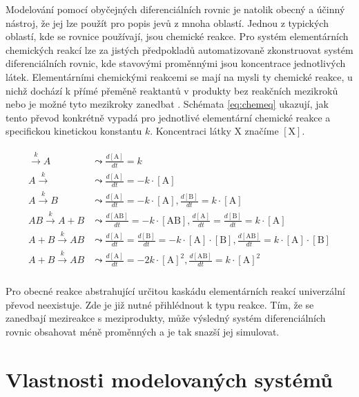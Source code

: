 Modelování pomocí obyčejných diferenciálních rovnic je natolik obecný a účinný nástroj,
že jej lze použít pro popis jevů z mnoha oblastí. Jednou z typických oblastí, kde
se rovnice používají, jsou chemické reakce. Pro systém elementárních chemických reakcí
lze za jistých předpokladů \cite{TODO} automatizovaně zkonstruovat systém diferenciálních rovnic,
kde stavovými proměnnými jsou koncentrace jednotlivých látek. Elementárními che\-mic\-ký\-mi
reakcemi se mají na mysli ty chemické reakce, u nichž dochází k přímé přeměně reaktantů
v produkty bez reakčních mezikroků nebo je možné tyto mezikroky zanedbat \cite{TODO}.
Schémata \ref{eq:chemeq} ukazují, jak tento převod konkrétně vypadá pro jednotlivé
elementární chemické reakce a specifickou kinetickou konstantu $k$. Koncentraci látky
$\textrm{X}$ značíme $[\textrm{X}]$.

\begin{align}\label{eq:chemeq}
\begin{array}{ll}
\xrightarrow{k} A			&\leadsto \frac{d[\textrm{A}]}{dt} = k						\\
A \xrightarrow{k} 			&\leadsto \frac{d[\textrm{A}]}{dt} = - k \cdot [\textrm{A}]	\\
A \xrightarrow{k} B			&\leadsto \frac{d[\textrm{A}]}{dt} = - k \cdot [\textrm{A}], \frac{d[\textrm{B}]}{dt} = k \cdot [\textrm{A}] \\
AB \xrightarrow{k} A + B	&\leadsto \frac{d[\textrm{AB}]}{dt} = - k \cdot [\textrm{AB}], \frac{d[\textrm{A}]}{dt} = \frac{d[\textrm{B}]}{dt} = k \cdot [\textrm{A}] \\
A + B \xrightarrow{k} AB	&\leadsto \frac{d[\textrm{A}]}{dt} = \frac{d[\textrm{B}]}{dt} = - k \cdot [\textrm{A}] \cdot [\textrm{B}], \frac{d[\textrm{AB}]}{dt} = k \cdot [\textrm{A}] \cdot [\textrm{B}] \\
A + B \xrightarrow{k} AB	&\leadsto \frac{d[\textrm{A}]}{dt} = - 2k \cdot [\textrm{A}]^2, \frac{d[\textrm{AB}]}{dt} = k \cdot [\textrm{A}]^2 \\
\end{array}
\end{align}

Pro obecné reakce abstrahující určitou kaskádu elementárních reakcí univerzální
převod neexistuje. Zde je již nutné přihlédnout k typu reakce. Tím, že se
zanedbají mezireakce s meziprodukty, může výsledný systém diferenciálních rovnic obsahovat
méně proměnných a je tak snazší jej simulovat.

\section{Vlastnosti modelovaných systémů}

